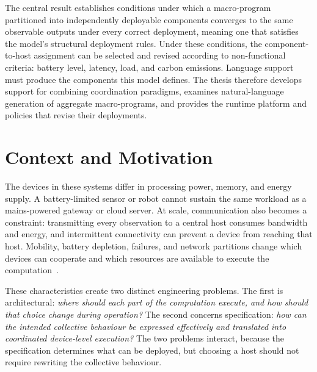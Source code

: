 The central result establishes conditions under which a macro-program partitioned into independently deployable components
converges to the same observable outputs under every correct deployment,
meaning one that satisfies the model's structural deployment rules.
%
Under these conditions, the component-to-host assignment can be selected and revised according to non-functional criteria:
battery level, latency, load, and carbon emissions.
%
Language support must produce the components this model defines.
The thesis therefore develops support for combining coordination paradigms,
examines natural-language generation of aggregate macro-programs,
and provides the runtime platform and policies that revise their deployments.

\section{Context and Motivation}
\label{sec:context-and-motivation}

The devices in these systems differ in processing power, memory, and energy supply.
A battery-limited sensor or robot cannot sustain the same workload as a mains-powered gateway or cloud server.
%
At scale, communication also becomes a constraint:
transmitting every observation to a central host consumes bandwidth and energy,
and intermittent connectivity can prevent a device from reaching that host.
%
Mobility, battery depletion, failures, and network partitions change which devices can cooperate
and which resources are available to execute the computation~\cite{DBLP:journals/iotj/ShiCZLX16,DBLP:journals/computer/Satyanarayanan17}.

These characteristics create two distinct engineering problems.
The first is architectural: \emph{where should each part of the computation execute, and how should that choice change during operation?}
The second concerns specification: \emph{how can the intended collective behaviour be expressed effectively and translated into coordinated device-level execution?}
%
The two problems interact, because the specification determines what can be deployed,
but choosing a host should not require rewriting the collective behaviour.

